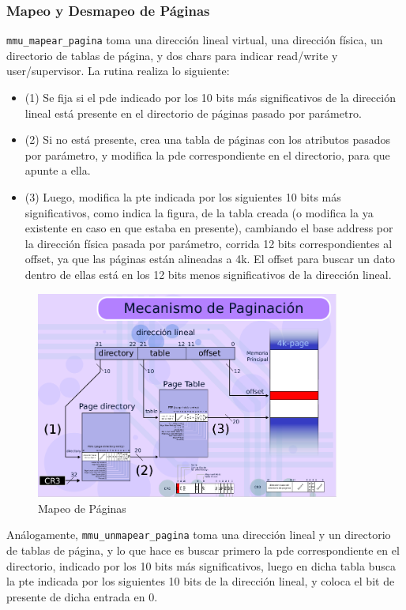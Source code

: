 \subsubsection*{Mapeo y Desmapeo de Páginas}

\par \texttt{mmu_mapear_pagina} toma una dirección lineal virtual, una dirección física, un directorio de tablas de página, y dos chars para indicar read/write y user/supervisor. La rutina realiza lo siguiente:
\begin{itemize}
\item (1) Se fija si el pde indicado por los 10 bits más significativos de la dirección lineal está presente en el directorio de páginas pasado por parámetro.
\item  (2) Si no está presente, crea una tabla de páginas con los atributos pasados por parámetro, y modifica la pde correspondiente en el directorio, para que apunte a ella.
\item (3) Luego, modifica la pte indicada por los siguientes 10 bits más significativos, como indica la figura, de la tabla creada (o modifica la ya existente en caso en que estaba en presente), cambiando el base address por la dirección física pasada por parámetro, corrida 12 bits correspondientes al offset, ya que las páginas están alineadas a 4k. El offset para buscar un dato dentro de ellas está en los 12 bits menos significativos de la dirección lineal.
\end{itemize}
\begin{figure}[ht!]
\centering
\includegraphics[width=100mm]{imagenes/paginacion.png}
\caption{Mapeo de Páginas}
\end{figure}

\par Análogamente, \texttt{mmu_unmapear_pagina} toma una dirección lineal y un directorio de tablas de página, y lo que hace es buscar primero la pde correspondiente en el directorio, indicado por los 10 bits más significativos, luego en dicha tabla busca la pte indicada por los siguientes 10 bits de la dirección lineal, y coloca el bit de presente de dicha entrada en 0.

